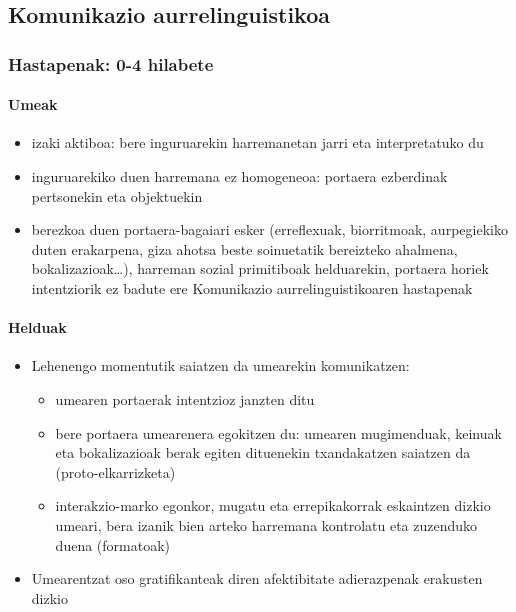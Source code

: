 \documentclass[
]{book}
\providecommand{\tightlist}{%
  \setlength{\itemsep}{0pt}\setlength{\parskip}{0pt}}
\begin{document}
\hypertarget{komunikazio-aurrelinguistikoa}{%
\subsection{Komunikazio aurrelinguistikoa}\label{komunikazio-aurrelinguistikoa}}

\hypertarget{hastapenak-0-4-hilabete}{%
\subsubsection{Hastapenak: 0-4 hilabete}\label{hastapenak-0-4-hilabete}}

\hypertarget{umeak}{%
\paragraph{Umeak}\label{umeak}}

\begin{itemize}
\tightlist
\item
  izaki aktiboa: bere inguruarekin harremanetan jarri eta interpretatuko du
\item
  inguruarekiko duen harremana ez homogeneoa: portaera ezberdinak pertsonekin eta objektuekin
\item
  berezkoa duen portaera-bagaiari esker (erreflexuak, biorritmoak, aurpegiekiko duten erakarpena, giza ahotsa beste soinuetatik bereizteko ahalmena, bokalizazioak\ldots), harreman sozial primitiboak helduarekin, portaera horiek intentziorik ez badute ere
  Komunikazio aurrelinguistikoaren hastapenak
\end{itemize}

\hypertarget{helduak}{%
\paragraph{Helduak}\label{helduak}}

\begin{itemize}
\tightlist
\item
  Lehenengo momentutik saiatzen da umearekin komunikatzen:

  \begin{itemize}
  \tightlist
  \item
    umearen portaerak intentzioz janzten ditu\\
  \item
    bere portaera umearenera egokitzen du: umearen mugimenduak, keinuak eta bokalizazioak berak egiten dituenekin txandakatzen saiatzen da (proto-elkarrizketa)\\
  \item
    interakzio-marko egonkor, mugatu eta errepikakorrak eskaintzen dizkio umeari, bera izanik bien arteko harremana kontrolatu eta zuzenduko duena (formatoak)
  \end{itemize}
\item
  Umearentzat oso gratifikanteak diren afektibitate adierazpenak erakusten dizkio
\end{itemize}
\end{document}
